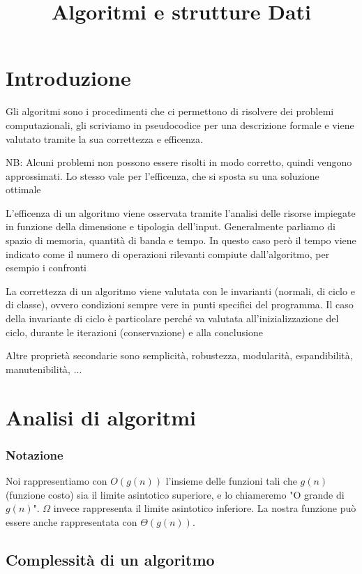 \documentclass[12pt, a4paper]{article}
\title{Algoritmi e strutture Dati}
\begin{document}
    

\section{Introduzione}
Gli algoritmi sono i procedimenti che ci permettono di risolvere dei problemi computazionali, gli scriviamo in 
pseudocodice per una descrizione formale e viene valutato tramite la sua correttezza e efficenza. 

NB: Alcuni problemi non possono essere risolti in modo corretto, quindi vengono approssimati. Lo stesso vale per
l'efficenza, che si sposta su una soluzione ottimale

L'efficenza di un algoritmo viene osservata tramite l'analisi delle risorse impiegate in funzione della dimensione
e tipologia dell'input. Generalmente parliamo di spazio di memoria, quantità di banda e tempo. In questo caso
però il tempo viene indicato come il numero di operazioni rilevanti compiute dall'algoritmo, per esempio i
confronti

La correttezza di un algoritmo viene valutata con le invarianti (normali, di ciclo e di classe), ovvero condizioni
sempre vere in punti specifici del programma. Il caso della invariante di ciclo è particolare perché va valutata
all'inizializzazione del ciclo, durante le iterazioni (conservazione) e alla conclusione

Altre proprietà secondarie sono semplicità, robustezza, modularità, espandibilità, manutenibilità, ...

\newpage
\section{Analisi di algoritmi}
\subsubsection*{Notazione}
Noi rappresentiamo con $O(g(n))$ l'insieme delle funzioni tali che $g(n)$ (funzione costo) sia il limite asintotico
superiore, e lo chiameremo "O grande di $g(n)$". $\Omega$ invece rappresenta il limite asintotico inferiore.
La nostra funzione può essere anche rappresentata con $\Theta(g(n))$.

\subsection{Complessità di un algoritmo}
\end{document}

